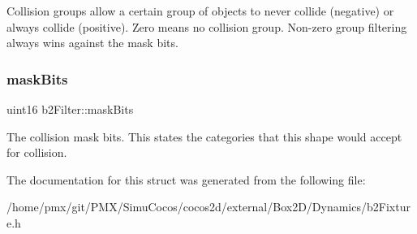 Collision groups allow a certain group of objects to never collide (negative) or always collide (positive). Zero means no collision group. Non-\/zero group filtering always wins against the mask bits. \mbox{\label{structb2Filter_a533cccf85e3ba3d9e3700d73b819f6e2}} 
\subsubsection{\texorpdfstring{mask\+Bits}{maskBits}}
{\footnotesize\ttfamily uint16 b2\+Filter\+::mask\+Bits}

The collision mask bits. This states the categories that this shape would accept for collision. 

The documentation for this struct was generated from the following file\+:\begin{DoxyCompactItemize}
\item 
/home/pmx/git/\+P\+M\+X/\+Simu\+Cocos/cocos2d/external/\+Box2\+D/\+Dynamics/b2\+Fixture.\+h\end{DoxyCompactItemize}
